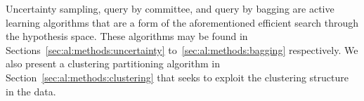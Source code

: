 \noindent Uncertainty sampling, query by committee, and query by bagging are 
active learning algorithms that are a form of the aforementioned efficient 
search through the hypothesis space. These algorithms may be found in 
Sections~\ref{sec:al:methods:uncertainty} to~\ref{sec:al:methods:bagging} 
respectively. We also present a clustering partitioning algorithm in 
Section~\ref{sec:al:methods:clustering} that seeks to exploit the clustering  
structure in the data.
